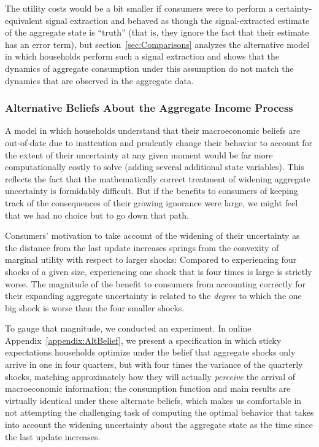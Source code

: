 \documentclass[titlepage]{\econtex}
\begin{document}
The utility costs would be a bit smaller if consumers were to perform a certainty-equivalent signal extraction and behaved as though the signal-extracted estimate of the aggregate state is ``truth'' (that is, they ignore the fact that their estimate has an error term), but section~\ref{sec:Comparisons} analyzes the alternative model in which households perform such a signal extraction and shows that the dynamics of aggregate consumption under this assumption do not match the dynamics that are observed in the aggregate data.

\hypertarget{AltBeliefs}{}
\subsubsection{Alternative Beliefs About the Aggregate Income Process}
A model in which households understand that their macroeconomic beliefs are out-of-date due to inattention and prudently change their behavior to account for the extent of their uncertainty at any given moment would be far more computationally costly to solve (adding several additional state variables).  This reflects the fact that the mathematically correct treatment of widening aggregate uncertainty is formidably difficult.  But if the benefits to consumers of keeping track of the consequences of their growing ignorance were large, we might feel that we had no choice but to go down that path.

Consumers' motivation to take account of the widening of their uncertainty as the distance from the last update increases springs from the convexity of marginal utility with respect to larger shocks: Compared to experiencing four shocks of a given size, experiencing one shock that is four times is large is strictly worse.  The magnitude of the benefit to consumers from accounting correctly for their expanding aggregate uncertainty is related to the \textit{degree} to which the one big shock is worse than the four smaller shocks.

To gauge that magnitude, we conducted an experiment.  In online Appendix~\ref{appendix:AltBelief}, we present a specification in which sticky expectations households optimize under the belief that aggregate shocks only arrive in one in four quarters, but with four times the variance of the quarterly shocks, matching approximately how they will actually \textit{perceive} the arrival of macroeconomic information; the consumption function and main results are virtually identical under these alternate beliefs, which makes us comfortable in not attempting the challenging task of computing the optimal behavior that takes into account the widening uncertainty about the aggregate state as the time since the last update increases.
\end{document}
